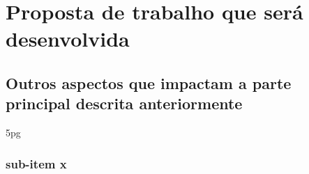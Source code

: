 \chapter{Proposta de trabalho que será desenvolvida}
\section{Outros aspectos que impactam a parte principal descrita anteriormente} 5pg
\subsection{sub-item x}